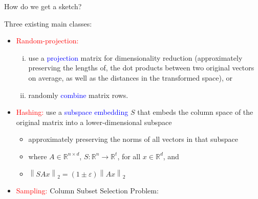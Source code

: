 \documentclass[first=dgreen,second=purple,logo=redque]{aaltoslides}
\newcommand{\vectornorm}[1]{\left\|#1\right\|}
\begin{document}
\begin{frame}[allowframebreaks=1]{How do we get a sketch?}

Three existing main classes:
\begin{itemize}
\item \textcolor{red}{Random-projection:} 
	\begin{enumerate}[(i)]
	
		\item use a \textcolor{blue}{projection} matrix for dimensionality reduction (\textcolor{dgreen}{approximately} preserving the lengths of, the dot products between two original vectors on average, as well as the distances in the transformed space), or
		\item randomly \textcolor{blue}{combine} matrix rows.
	\end{enumerate}
\item \textcolor{red}{Hashing:} use a \textcolor{blue}{subspace embedding} $S$ that embeds the column space of the original matrix into a lower-dimensional subspace
	\begin{itemize}
		\item \textcolor{dgreen}{approximately} preserving the norms of all vectors in that subspace
		\item where $A \in \mathbb{R}^{n \times d}$, $S : \mathbb{R}^{n} \rightarrow \mathbb{R}^{t}$, for all $x \in \mathbb{R}^{d}$, and
		\item $\vectornorm{SAx}_{2} = (1 \pm \varepsilon)\vectornorm{Ax}_{2}$
	\end{itemize}
\item \textcolor{red}{Sampling:} \textcolor{dgreen}{Column Subset Selection Problem}:
\end{itemize}


\end{frame}
\end{document}
